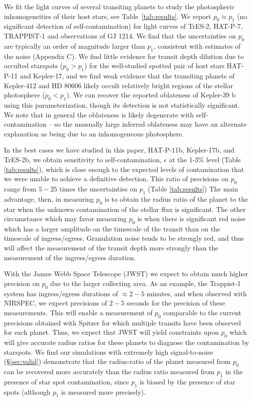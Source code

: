 We fit the light curves of several transiting planets to study the photospheric inhomogeneities of their host stars, see Table~\ref{tab:results}. We report $p_0 \approx p_1$ (no significant detection of self-contamination) for \kepler light curves of TrES-2, HAT-P-7, TRAPPIST-1 and \spitzer observations of GJ 1214.  We find that the uncertainties on $p_0$ are typically an order of magnitude larger than $p_1$, consistent with estimates of the noise (Appendix C).
We find little evidence for transit depth dilution due to occulted starspots ($p_0 > p_1$) for the well-studied spotted pair of host stars HAT-P-11 and Kepler-17, and we find weak evidence that the transiting planets of Kepler-412 and HD 80606 likely occult relatively bright regions of the stellar photosphere ($p_0 < p_1$). We can recover the reported oblateness of Kepler-39 b using this parameterization, though its detection is not statistically significant.   We note that in general the oblateness is likely degenerate with self-contamination -- so the unusually large inferred oblateness may have an alternate explanation as being due to an inhomogeneous photosphere.

In the best cases we have studied in this paper, HAT-P-11b, Kepler-17b, and TrES-2b, we obtain sensitivity to
self-contamination, $\epsilon$ at the 1-3\% level (Table \ref{tab:results}), which is close enough to the
expected levels of contamination that we were unable to achieve a definitive detection.
This ratio of precisions on $p_0$ range from $5-25$ times the uncertainties on $p_1$ (Table \ref{tab:results}) 
The main advantage, then, in measuring $p_0$ is to obtain the radius ratio of the planet
to the star when the unknown contamination of the stellar flux is significant.
The other circumstance which may favor measuring $p_0$ is when there is significant
red noise which has a larger amplitude on the timescale of the transit than on the
timescale of ingress/egress.  
Granulation noise tends to be strongly red, and thus will affect the measurement
of the transit depth more strongly than the measurement of the ingress/egress duration.

With the James Webb Space Telescope (JWST) we expect to obtain much higher precision on $p_0$ due to the larger collecting area.
As an example, the Trappist-1 system has ingress/egress durations of $\approx 2-5$ minutes, and when
observed with NIRSPEC, we expect precisions of $2-5$ seconds for the precision of these measurements.
This will enable a measurement of $p_0$ comparable to the current precisions obtained with Spitzer
for which multiple transits have been observed for each planet.  Thus, we expect that JWST will yield
constraints upon $p_0$ which will give accurate radius ratios for these planets to diagnose the contamination by starspots.  We find our simulations with extremely high signal-to-noise (\S \ref{sec:valid}) demonstrate that the radius-ratio of the planet measured from $p_0$ can be recovered more accurately than the radius ratio measured from $p_1$ in the presence of star spot contamination, since $p_1$ is biased by the presence of star spots (although $p_1$ is measured more precisely).

